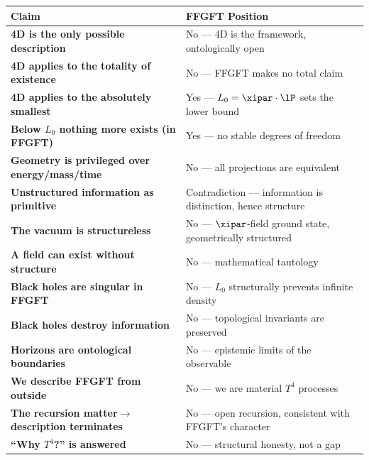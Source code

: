 \begin{longtable}{>{\bfseries}p{7.2cm} p{7.2cm}}
\toprule
Claim & FFGFT Position \\
\midrule
4D is the only possible description & No --- 4D is the framework, ontologically open \\
4D applies to the totality of existence & No --- FFGFT makes no total claim \\
4D applies to the absolutely smallest & Yes --- $L_0 = \xipar \cdot \lP$ sets the lower bound \\
Below $L_0$ nothing more exists (in FFGFT) & Yes --- no stable degrees of freedom \\
Geometry is privileged over energy/mass/time & No --- all projections are equivalent \\
Unstructured information as primitive & Contradiction --- information is distinction, hence structure \\
The vacuum is structureless & No --- $\xipar$-field ground state, geometrically structured \\
A field can exist without structure & No --- mathematical tautology \\
Black holes are singular in FFGFT & No --- $L_0$ structurally prevents infinite density \\
Black holes destroy information & No --- topological invariants are preserved \\
Horizons are ontological boundaries & No --- epistemic limits of the observable \\
We describe FFGFT from outside & No --- we are material $T^4$ processes \\
The recursion matter$\to$description terminates & No --- open recursion, consistent with FFGFT's character \\
``Why $T^4$?'' is answered & No --- structural honesty, not a gap \\
\bottomrule
\end{longtable}

